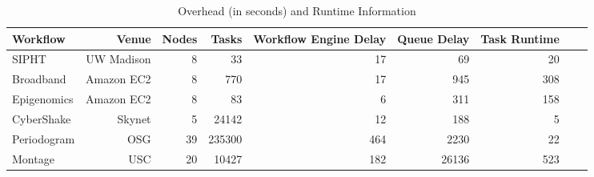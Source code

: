 \begin{table}[!htb]
\caption{Overhead (in seconds) and Runtime Information }
\label{tab:model_stats}
\centering
\begin{tabular}{lrrrrrrrr}
\hline
Workflow & Venue & Nodes & Tasks & Workflow Engine Delay  &  Queue Delay  & Task Runtime  \\

\hline

SIPHT & UW Madison & 8 & 33 & 17 & 69 & 20\\ 
Broadband & Amazon EC2 & 8 &770 & 17 &945&308\\
Epigenomics &Amazon EC2&8& 83 &6&311&158\\
CyberShake &Skynet&5&24142&12&188&5\\
Periodogram &OSG&39&235300&464&2230&22\\
Montage &USC&20&10427&182&26136&523\\


\hline
\end{tabular}
\end{table} 






